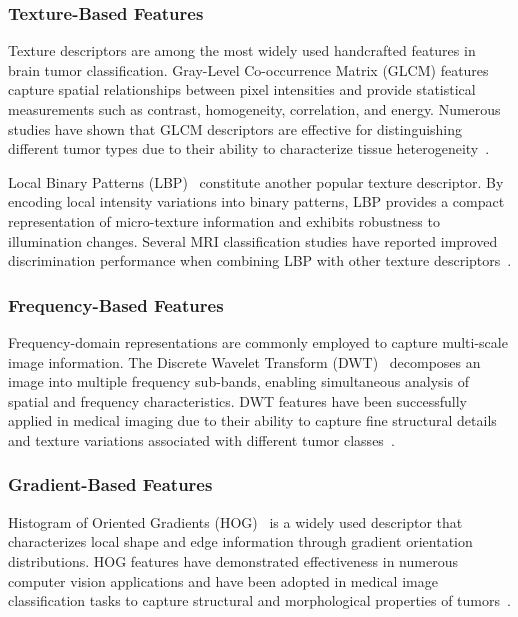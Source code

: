 \subsubsection{Texture-Based Features}
Texture descriptors are among the most widely used handcrafted features in
brain tumor classification. Gray-Level Co-occurrence Matrix (GLCM)
features~\cite{haralick1973} capture spatial relationships between pixel
intensities and provide statistical measurements such as contrast, homogeneity,
correlation, and energy. Numerous studies have shown that GLCM descriptors are
effective for distinguishing different tumor types due to their ability to
characterize tissue heterogeneity~\cite{pattanaik2022,dheepak2024}.

Local Binary Patterns (LBP)~\cite{ojala2002} constitute another popular texture
descriptor. By encoding local intensity variations into binary patterns, LBP
provides a compact representation of micro-texture information and exhibits
robustness to illumination changes. Several MRI classification studies have
reported improved discrimination performance when combining LBP with other
texture descriptors~\cite{dheepak2024,basthikodi2024}.

\subsubsection{Frequency-Based Features}
Frequency-domain representations are commonly employed to capture multi-scale
image information. The Discrete Wavelet Transform (DWT)~\cite{mallat1989}
decomposes an image into multiple frequency sub-bands, enabling simultaneous
analysis of spatial and frequency characteristics. DWT features have been
successfully applied in medical imaging due to their ability to capture fine
structural details and texture variations associated with different tumor
classes~\cite{shukla2025}.

\subsubsection{Gradient-Based Features}
Histogram of Oriented Gradients (HOG)~\cite{dalal2005} is a widely used
descriptor that characterizes local shape and edge information through gradient
orientation distributions. HOG features have demonstrated effectiveness in
numerous computer vision applications and have been adopted in medical image
classification tasks to capture structural and morphological properties of
tumors~\cite{basthikodi2024,kumar2024}.

